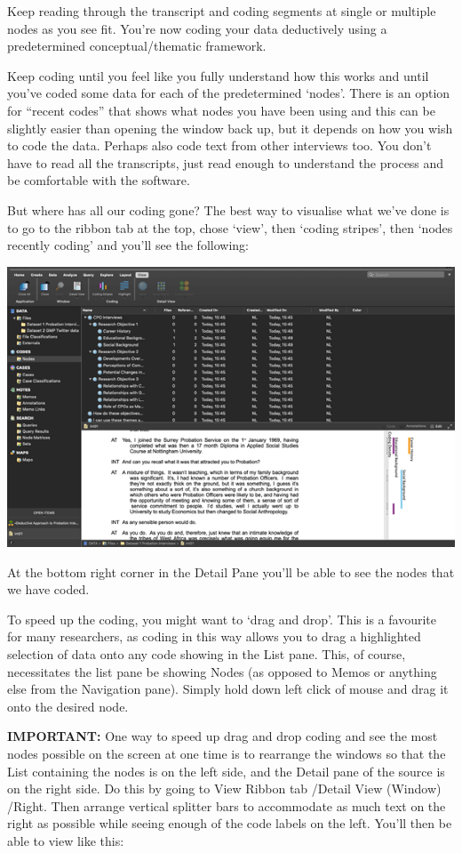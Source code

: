\documentclass[
]{book}
\begin{document}
Keep reading through the transcript and coding segments at single or multiple nodes as you see fit. You're now coding your data deductively using a predetermined conceptual/thematic framework.

Keep coding until you feel like you fully understand how this works and until you've coded some data for each of the predetermined `nodes'. There is an option for ``recent codes'' that shows what nodes you have been using and this can be slightly easier than opening the window back up, but it depends on how you wish to code the data. Perhaps also code text from other interviews too. You don't have to read all the transcripts, just read enough to understand the process and be comfortable with the software.

But where has all our coding gone? The best way to visualise what we've done is to go to the ribbon tab at the top, chose `view', then `coding stripes', then `nodes recently coding' and you'll see the following:

\includegraphics{imgs/code_gone.png}

At the bottom right corner in the Detail Pane you'll be able to see the nodes that we have coded.

To speed up the coding, you might want to `drag and drop'. This is a favourite for many researchers, as coding in this way allows you to drag a highlighted selection of data onto any code showing in the List pane. This, of course, necessitates the list pane be showing Nodes (as opposed to Memos or anything else from the Navigation pane). Simply hold down left click of mouse and drag it onto the desired node.

\textbf{IMPORTANT:} One way to speed up drag and drop coding and see the most nodes possible on the screen at one time is to rearrange the windows so that the List containing the nodes is on the left side, and the Detail pane of the source is on the right side. Do this by going to View Ribbon tab /Detail View (Window) /Right. Then arrange vertical splitter bars to accommodate as much text on the right as possible while seeing enough of the code labels on the left. You'll then be able to view like this:
\end{document}
